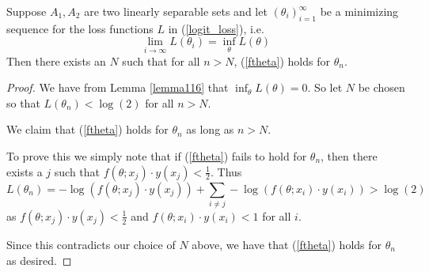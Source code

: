 \begin{lemma}\label{lemma146}
Suppose $A_1,A_2$ are two linearly separable sets and let $(\theta_i)_{i = 1}^\infty$ be
a minimizing sequence for the loss functions $L$ in (\ref{logit_loss}), i.e.
\begin{equation}
 \lim_{i\rightarrow \infty} L(\theta_i) = \inf_{\theta} L(\theta)
\end{equation}
 Then there exists an $N$ such that for all $n > N$, (\ref{ftheta}) holds for $\theta_n$.
\end{lemma}
\begin{proof}
 We have from Lemma \ref{lemma116} that $\inf_{\theta} L(\theta) = 0$. So let $N$ be chosen so that
 $L(\theta_n) < \log(2)$ for all $n > N$. 
 
 We claim that (\ref{ftheta}) holds for $\theta_n$ as long
 as $n > N$. 
 
 To prove this we simply note that if (\ref{ftheta}) fails to hold for $\theta_n$, then
 there exists a $j$ such that $f(\theta;x_j)\cdot y(x_j) < \frac{1}{2}$. Thus
 \begin{equation}
  L(\theta_n) = -\log\left(f(\theta;x_j)\cdot y(x_j)\right) + \displaystyle\sum_{i\neq j}-\log\left(f(\theta;x_i)\cdot y(x_i)\right) > \log(2)
 \end{equation}
 as $f(\theta;x_j)\cdot y(x_j) < \frac{1}{2}$ and $f(\theta;x_i)\cdot y(x_i) < 1$ for all $i$.

 Since this contradicts our choice of $N$ above, we have that (\ref{ftheta}) holds for $\theta_n$ as desired.
\end{proof}

